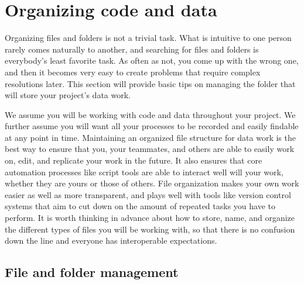 \section{Organizing code and data}

Organizing files and folders is not a trivial task.
What is intuitive to one person rarely comes naturally to another,
and searching for files and folders is everybody's least favorite task.
As often as not, you come up with the wrong one,
and then it becomes very easy to create problems that require complex resolutions later.
This section will provide basic tips on managing the folder
that will store your project's data work.

We assume you will be working with code and data throughout your project.
We further assume you will want all your processes to be recorded
and easily findable at any point in time.
Maintaining an organized file structure for data work is the best way
to ensure that you, your teammates, and others
are able to easily work on, edit, and replicate your work in the future.
It also ensures that core automation processes like script tools
are able to interact well will your work,
whether they are yours or those of others.
File organization makes your own work easier as well as more transparent,
and plays well with tools like version control systems
that aim to cut down on the amount of repeated tasks you have to perform.
It is worth thinking in advance about how to store, name, and organize
the different types of files you will be working with,
so that there is no confusion down the line
and everyone has interoperable expectations.

\subsection{File and folder management}

